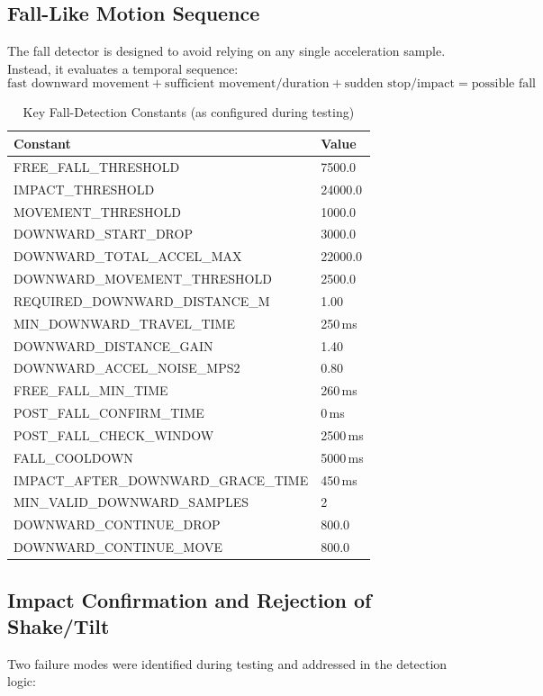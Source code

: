 \documentclass[lettersize,journal]{IEEEtran}
\begin{document}
\subsection{Fall-Like Motion Sequence}
The fall detector is designed to avoid relying on any single acceleration sample. Instead, it evaluates a temporal sequence:
\[
\text{fast downward movement} + \text{sufficient movement/duration} + \text{sudden stop/impact} = \text{possible fall}
\]

\begin{table}[!t]
\caption{Key Fall-Detection Constants (as configured during testing)}
\label{tab:constants}
\centering
\footnotesize
\begin{tabular}{@{}ll@{}}
\toprule
Constant & Value \\
\midrule
FREE\_FALL\_THRESHOLD & 7500.0 \\
IMPACT\_THRESHOLD & 24000.0 \\
MOVEMENT\_THRESHOLD & 1000.0 \\
DOWNWARD\_START\_DROP & 3000.0 \\
DOWNWARD\_TOTAL\_ACCEL\_MAX & 22000.0 \\
DOWNWARD\_MOVEMENT\_THRESHOLD & 2500.0 \\
REQUIRED\_DOWNWARD\_DISTANCE\_M & 1.00 \\
MIN\_DOWNWARD\_TRAVEL\_TIME & 250\,ms \\
DOWNWARD\_DISTANCE\_GAIN & 1.40 \\
DOWNWARD\_ACCEL\_NOISE\_MPS2 & 0.80 \\
FREE\_FALL\_MIN\_TIME & 260\,ms \\
POST\_FALL\_CONFIRM\_TIME & 0\,ms \\
POST\_FALL\_CHECK\_WINDOW & 2500\,ms \\
FALL\_COOLDOWN & 5000\,ms \\
IMPACT\_AFTER\_DOWNWARD\_GRACE\_TIME & 450\,ms \\
MIN\_VALID\_DOWNWARD\_SAMPLES & 2 \\
DOWNWARD\_CONTINUE\_DROP & 800.0 \\
DOWNWARD\_CONTINUE\_MOVE & 800.0 \\
\bottomrule
\end{tabular}
\end{table}

\subsection{Impact Confirmation and Rejection of Shake/Tilt}
Two failure modes were identified during testing and addressed in the detection logic:
\end{document}
